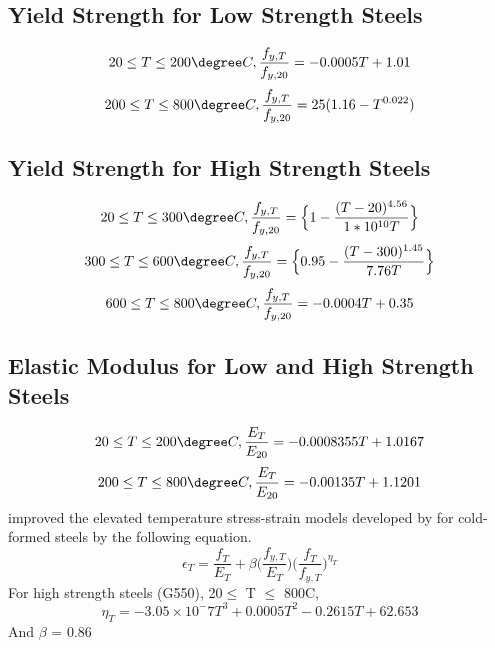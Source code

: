  \subsection*{Yield Strength for Low Strength Steels}
\begin{equation}
20 \leq T \leq 200\degree C , \dfrac{f_{y,T}}{f_{y,20}} = -0.0005T+1.01
\label{eq:yield_low1}
\end{equation}
\begin{equation}
200 \leq T \leq 800\degree C , \dfrac{f_{y,T}}{f_{y,20}} = 25(1.16-T^{0.022})
\label{eq:yield_low2}
\end{equation}
\subsection*{Yield Strength for High Strength Steels}
\begin{equation}
20 \leq T \leq 300\degree C , \dfrac{f_{y,T}}{f_{y,20}} = \Big\{ 1-\dfrac{(T-20)^{4.56}}{1*10^{10}T} \Big\}
\label{eq:yield_low3}
\end{equation}
\begin{equation}
300 \leq T \leq 600\degree C , \dfrac{f_{y,T}}{f_{y,20}} = \Big\{ 0.95-\dfrac{(T-300)^{1.45}}{7.76T} \Big\}
\label{eq:yield_low4}
\end{equation}
\begin{equation}
600 \leq T \leq 800\degree C , \dfrac{f_{y,T}}{f_{y,20}} = -0.0004T + 0.35
\label{eq:yield_low5}
\end{equation}
\subsection*{Elastic Modulus for Low and High Strength Steels}
\begin{equation}
20 \leq T \leq 200\degree C , \dfrac{E_T}{E_{20}} = -0.0008355T+1.0167
\label{eq:yield_high1}
\end{equation}
\begin{equation}
200 \leq T \leq 800\degree C , \dfrac{E_T}{E_{20}} = -0.00135T+1.1201
\label{eq:yield_high2}
\end{equation}
\citet{Kankanamge2011} improved the elevated temperature stress-strain models developed by \citet{Ranawaka2009} for cold-formed steels by the following equation. 
\begin{equation}
\epsilon_T = \dfrac{f_T}{E_T} + \beta \Big(\dfrac{f_{y,T}}{E_T}\Big)\Big(\dfrac{f_T}{f_{y,T}}\Big)^{\eta_{T}}
\label{eq:yield_high3}
\end{equation}
For high strength steels (G550), 20$ \leq$ T $\leq$ 800\degree C,
\begin{equation}
	\eta_T = -3.05 \times 10^-7 T^3 + 0.0005T^2 - 0.2615T + 62.653
	\label{eq:yield_high4}
	\end{equation}
	And
	$\beta$ = 0.86

